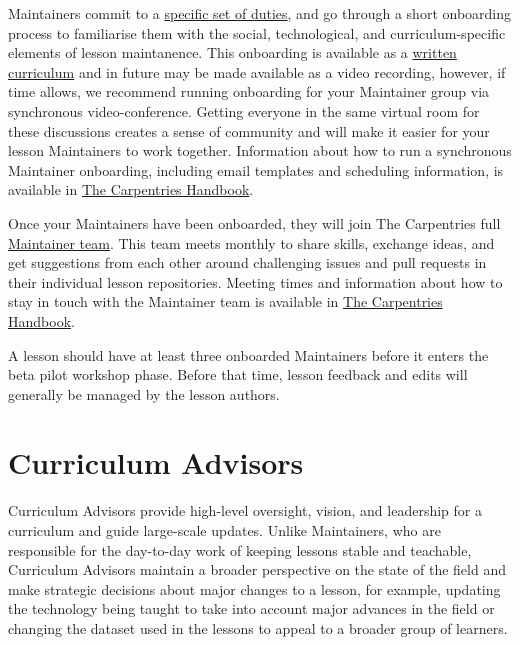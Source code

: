 \documentclass[
]{book}
\begin{document}
Maintainers commit to a \href{https://docs.carpentries.org/topic_folders/maintainers/maintainers.html\#maintainer-guidelines}{specific set of duties}, and
go through a short onboarding process to familiarise them with the social,
technological, and curriculum-specific elements of lesson maintanence.
This onboarding is available as a \href{https://carpentries.github.io/maintainer-onboarding/}{written curriculum}
and in future may be made available as a video recording, however, if
time allows, we recommend running onboarding for your Maintainer group via
synchronous video-conference. Getting everyone in the same virtual room for
these discussions creates a sense of community and will make it easier for
your lesson Maintainers to work together. Information about how to run
a synchronous Maintainer onboarding, including email templates and
scheduling information, is available in \href{https://docs.carpentries.org/topic_folders/maintainers/maintainers.html\#maintainer-onboarding}{The Carpentries Handbook}.

Once your Maintainers have been onboarded, they will join The Carpentries
full \href{https://carpentries.org/maintainers/}{Maintainer team}. This team meets monthly to share
skills, exchange ideas, and get suggestions from each other around
challenging issues and pull requests in their individual lesson repositories.
Meeting times and information about how to stay in touch with the Maintainer
team is available in \href{https://docs.carpentries.org/topic_folders/maintainers/maintainers.html\#how-to-stay-in-touch}{The Carpentries Handbook}.

A lesson should have at least three onboarded Maintainers before it enters the
beta pilot workshop phase. Before that time, lesson feedback and edits will generally be
managed by the lesson authors.

\hypertarget{curriculum-advisors}{%
\section{Curriculum Advisors}\label{curriculum-advisors}}

Curriculum Advisors provide high-level oversight, vision, and leadership for a
curriculum and guide large-scale updates. Unlike Maintainers, who are responsible
for the day-to-day work of keeping lessons stable and teachable, Curriculum
Advisors maintain a broader perspective on the state of the field and make
strategic decisions about major changes to a lesson, for example, updating the
technology being taught to take into account major advances in the field or
changing the dataset used in the lessons to appeal to a broader group of learners.
\end{document}
